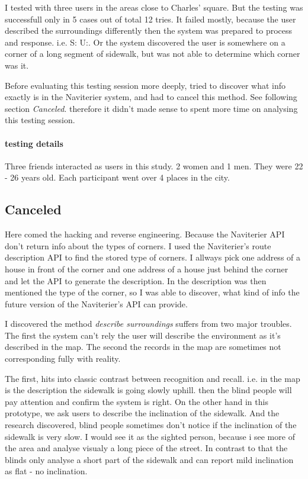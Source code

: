 				I tested with three users in the areas close to Charles' square. But the testing was successfull only in 5 cases out of total 12 tries. It failed mostly, because the user described the surroundings differently then the system was prepared to process and response. i.e. S: U:. Or the system discovered the user is somewhere on a corner of a long segment of sidewalk, but was not able to determine which corner was it.
				
				Before evaluating this testing session  more deeply, tried to discover what info exactly is in the Naviterier system, and had to cancel this method. See following section \emph{Canceled}. therefore it didn't made sense to spent more time on analysing this testing session.
				
				\paragraph{testing details}
					Three friends interacted as users in this study. 2 women and 1 men. They were 22 - 26 years old. Each participant went over 4 places in the city.		
			\subsection{Canceled}
				Here comed the hacking and reverse engineering. Because the Naviterier API \cite{naviterier-api} don't return info about the types of corners. I used the Naviterier's route description API \cite{naviterier-route-description} to find the stored type of corners. I allways pick one address of a house in front of the corner and one address of a house just behind the corner and let the API to generate the description. In the description was then mentioned the type of the corner, so I was able to discover, what kind of info the future version of the Naviterier's API\cite{naviterier-api} can provide.
				
				I discovered the method \emph{describe surroundings} suffers from two major troubles. The first the system can't rely the user will describe the environment as it's  described in the map. The second the records in the map are sometimes not corresponding fully with reality.
				
				The first, hits into classic contrast between recognition and recall. i.e. in the map is the description the sidewalk is going slowly uphill. then the blind people will pay attention and confirm the system is right. On the other hand in this prototype, we ask users to describe the inclination of the sidewalk. And the research discovered, blind people sometimes don't notice if the inclination of the sidewalk is very slow. I would see it as the sighted person, because i see more of the area and analyse visualy a long piece of the street. In contrast to that the blinds only analyse a short part of the sidewalk and can report mild inclination as flat - no inclination. 
				
